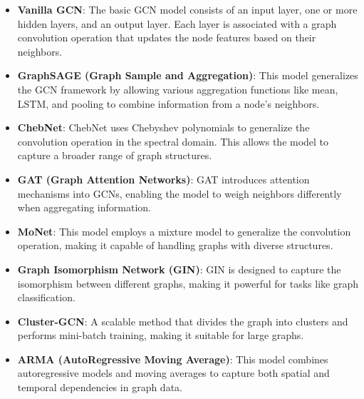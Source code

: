     \begin{itemize}
        \item \textbf{Vanilla GCN}: The basic GCN model consists of an input layer, one or more hidden layers, and an output layer. Each layer is associated with a graph convolution operation that updates the node features based on their neighbors.
        
        \item \textbf{GraphSAGE (Graph Sample and Aggregation)}: This model generalizes the GCN framework by allowing various aggregation functions like mean, LSTM, and pooling to combine information from a node's neighbors.
        
        \item \textbf{ChebNet}: ChebNet uses Chebyshev polynomials to generalize the convolution operation in the spectral domain. This allows the model to capture a broader range of graph structures.
        
        \item \textbf{GAT (Graph Attention Networks)}: GAT introduces attention mechanisms into GCNs, enabling the model to weigh neighbors differently when aggregating information.
        
        \item \textbf{MoNet}: This model employs a mixture model to generalize the convolution operation, making it capable of handling graphs with diverse structures.
        
        \item \textbf{Graph Isomorphism Network (GIN)}: GIN is designed to capture the isomorphism between different graphs, making it powerful for tasks like graph classification.
        
        \item \textbf{Cluster-GCN}: A scalable method that divides the graph into clusters and performs mini-batch training, making it suitable for large graphs.
        
        \item \textbf{ARMA (AutoRegressive Moving Average)}: This model combines autoregressive models and moving averages to capture both spatial and temporal dependencies in graph data.
    \end{itemize}



